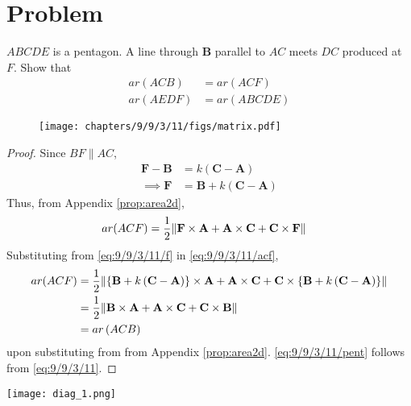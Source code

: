 \documentclass[10pt, a4paper]{article}
\title{\mytitle}
\author{\myauthor\hspace{1em}\\\contact\\FWC22034\hspace{6.5em}IITH\hspace{0.5em}\mymodule\hspace{6em}Assignment}
\providecommand{\brak}[1]{\ensuremath{\left(#1\right)}}
\providecommand{\cbrak}[1]{\ensuremath{\left\{#1\right\}}}
\let\vec\mathbf
\begin{document}
	\maketitle
	\tableofcontents
   \section{Problem}
   \fi
   $ABCDE$ is a pentagon. A line through
$\vec{B}$ parallel to $AC$ meets $DC$ produced at $F$. Show
that 
\begin{align}
		\label{eq:9/9/3/11}
	ar (ACB) &= ar (ACF)        
\\
	ar (AEDF) &= ar (ABCDE)
		\label{eq:9/9/3/11/pent}
\end{align}
	\begin{figure}[H]
		\centering
 \texttt{[image: chapters/9/9/3/11/figs/matrix.pdf]}
		\caption{}
		\label{fig:9/9/3/11}
  	\end{figure}
	\begin{proof}
		Since $BF \parallel AC$,
		\begin{align}
			\vec{F}-\vec{B}&=k\brak{\vec{C}-\vec{A}}
			\\
			\implies \vec{F}&=\vec{B}+k\brak{\vec{C}-\vec{A}}
		\label{eq:9/9/3/11/f}
		\end{align}
		Thus, from  Appendix
  \ref{prop:area2d},
\begin{align}
ar (ACF)
	&= 
 \frac{1}{2}\norm{\vec{F} \times \vec{A}+\vec{A} \times \vec{C}+\vec{C} \times \vec{F}}
		\label{eq:9/9/3/11/acf}
\end{align}
	Substituting from 
		\eqref{eq:9/9/3/11/f}
		in 
		\eqref{eq:9/9/3/11/acf},
\begin{align}
ar (ACF)
	&= \frac{1}{2}\norm{\cbrak{\vec{B}+k\brak{\vec{C}-\vec{A}}} \times \vec{A}+\vec{A} \times \vec{C}+\vec{C} \times \cbrak{\vec{B}+k\brak{\vec{C}-\vec{A}}}}
	\\
	&= \frac{1}{2}\norm{\vec{B} \times \vec{A}+\vec{A} \times \vec{C}+\vec{C} \times \vec{B}}
	\\
	&= ar\brak{ACB}
\end{align}
upon substituting from		from  Appendix
  \ref{prop:area2d}.
		\eqref{eq:9/9/3/11/pent}
		follows from 
		\eqref{eq:9/9/3/11}.

	\end{proof}

\iffalse

	    \texttt{[image: diag\_1.png]}
\end{document}
